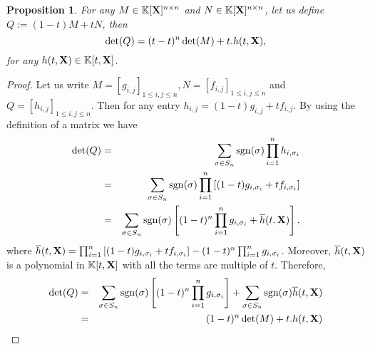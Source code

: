 \documentclass[11pt]{article}
\numberwithin{Property}{section}
\numberwithin{Theorem}{section}
\newtheorem{Proposition}{Proposition}%
\numberwithin{Proposition}{section}
\numberwithin{Lemma}{section}
\numberwithin{Corollary}{section}
\numberwithin{Definition}{section}
\numberwithin{Remark}{section}
\numberwithin{Conjecture}{section}
\numberwithin{Problem}{section}
\numberwithin{Example}{section}
\numberwithin{Claim}{section}
\renewcommand{\leq}{\leqslant}
\def\bar{\overline}
\newcommand{\field}{\mathbb{K}} %
\newcommand{\mat}[1]{\mathbf{\MakeUppercase{#1}}} %
\begin{document}
\begin{Proposition}\label{det}
For any $M \in \field[\mat{X}]^{n \times n}$ and $N \in \field[\mat{X}]^{n \times n}$, let us define $Q := (1-t)M + tN$, then 
\[
\det(Q) = (t-t)^n \det(M) + t.h(t,\mat{X}),
\] for any $h(t,\mat{X}) \in \field[t,\mat{X}]$.
\end{Proposition}
\begin{proof}
Let us write $M = [g_{i,j}]_{1 \leq i,j \leq n}, N = [f_{i,j}]_{1 \leq i,j \leq n}$ and $Q = [h_{i,j}]_{1 \leq i,j \leq n}$. Then for any entry $h_{i,j} = (1-t)g_{i,j} + tf_{i,j}$. By using the definition of a matrix we have 
\begin{eqnarray*}
\det(Q) &=& \sum_{\sigma \in S_n}\mathrm{sgn}(\sigma)\prod_{i = 1}^nh_{i,\sigma_i}\\
&=& \sum_{\sigma \in S_n}\mathrm{sgn}(\sigma)\prod_{i = 1}^n\left[(1-t)g_{i,\sigma_i} + tf_{i,\sigma_i}\right]\\
&=& \sum_{\sigma \in S_n}\mathrm{sgn}(\sigma)\left[(1-t)^n\prod_{i = 1}^ng_{i,\sigma_i} + \bar{h}(t,\mat{X})\right],
\end{eqnarray*}
where $\bar{h}(t,\mat{X}) = \prod_{i = 1}^n\left[(1-t)g_{i,\sigma_i} + tf_{i,\sigma_i}\right] - (1-t)^n\prod_{i = 1}^ng_{i,\sigma_i}$. Moreover, $\bar{h}(t,\mat{X})$ is a polynomial in $\field[t, \mat{X}]$ with all the terms are multiple of $t$. Therefore, 
\begin{eqnarray*}
\det(Q) &=&  \sum_{\sigma \in S_n}\mathrm{sgn}(\sigma)\left[(1-t)^n\prod_{i = 1}^ng_{i,\sigma_i}\right] + \sum_{\sigma \in S_n}\mathrm{sgn}(\sigma)\bar{h}(t,\mat{X}) \\
&=& (1-t)^n\det(M) + t.h(t,\mat{X})
\end{eqnarray*}
\end{proof}
\end{document}
